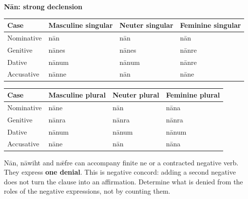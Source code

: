 \textbf{Nān: strong declension}

\par\begingroup
\fontsize{10.5}{13.2}\selectfont
\setlength{\LTleft}{0pt}\setlength{\LTright}{\fill}
\noindent
\begin{tabular}{@{}>{\raggedright\arraybackslash}p{22.0mm}>{\raggedright\arraybackslash}p{31.188mm}>{\raggedright\arraybackslash}p{31.188mm}>{\raggedright\arraybackslash}p{31.188mm}@{}}
\toprule
\textbf{Case} & \textbf{Masculine singular} & \textbf{Neuter singular} & \textbf{Feminine singular} \\
\midrule
Nominative & nān & nān & nān \\
Genitive & nānes & nānes & nānre \\
Dative & nānum & nānum & nānre \\
Accusative & nānne & nān & nāne \\
\bottomrule
\end{tabular}
\par\endgroup
\par\addvspace{5pt}
\par\begingroup
\fontsize{10.5}{13.2}\selectfont
\setlength{\LTleft}{0pt}\setlength{\LTright}{\fill}
\noindent
\begin{tabular}{@{}>{\raggedright\arraybackslash}p{22.0mm}>{\raggedright\arraybackslash}p{31.188mm}>{\raggedright\arraybackslash}p{31.188mm}>{\raggedright\arraybackslash}p{31.188mm}@{}}
\toprule
\textbf{Case} & \textbf{Masculine plural} & \textbf{Neuter plural} & \textbf{Feminine plural} \\
\midrule
Nominative & nāne & nān & nāna \\
Genitive & nānra & nānra & nānra \\
Dative & nānum & nānum & nānum \\
Accusative & nāne & nān & nāna \\
\bottomrule
\end{tabular}
\par\endgroup

Nān, nāwiht and nǣfre can accompany finite ne or a contracted negative verb. They express \textbf{one denial}. This is negative concord: adding a second negative does not turn the clause into an affirmation. Determine what is denied from the roles of the negative expressions, not by counting them.

